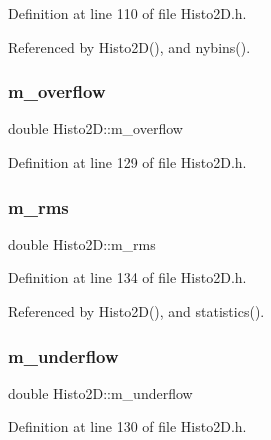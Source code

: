 Definition at line 110 of file Histo2\+D.\+h.



Referenced by Histo2\+D(), and nybins().

\mbox{\label{classHisto2D_a7ab17bc811ce4a5b45ab3779cc8e221a}} 
\subsubsection{\texorpdfstring{m\+\_\+overflow}{m\_overflow}}
{\footnotesize\ttfamily double Histo2\+D\+::m\+\_\+overflow\hspace{0.3cm}{\ttfamily [private]}}



Definition at line 129 of file Histo2\+D.\+h.

\mbox{\label{classHisto2D_a461938b95bb93a810ae7941a181023cc}} 
\subsubsection{\texorpdfstring{m\+\_\+rms}{m\_rms}}
{\footnotesize\ttfamily double Histo2\+D\+::m\+\_\+rms\hspace{0.3cm}{\ttfamily [private]}}



Definition at line 134 of file Histo2\+D.\+h.



Referenced by Histo2\+D(), and statistics().

\mbox{\label{classHisto2D_ab21996b2788e5d0e78bb611df3584440}} 
\subsubsection{\texorpdfstring{m\+\_\+underflow}{m\_underflow}}
{\footnotesize\ttfamily double Histo2\+D\+::m\+\_\+underflow\hspace{0.3cm}{\ttfamily [private]}}



Definition at line 130 of file Histo2\+D.\+h.


